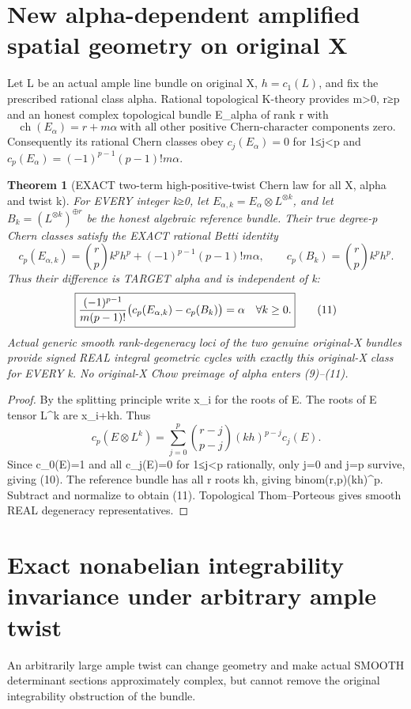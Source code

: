 \documentclass[11pt]{article}
\newtheorem{theorem}{Theorem}[section]
\begin{document}
\section{New alpha-dependent amplified spatial geometry on original X}
Let L be an actual ample
line bundle on original X,
$h=c_1(L)$, and fix the
prescribed rational class
alpha. Rational topological
K-theory provides m>0,
r≥p and an honest
complex topological bundle
E_alpha of rank r with
\[
 \boxed{
 \operatorname{ch}(E_\alpha)
     =r+m\alpha
 \ \text{with all other
 positive Chern-character
 components zero.}
 }                                                     \tag{9}
\]
Consequently its rational
Chern classes obey
$c_j(E_\alpha)=0$ for 1≤j<p
and
$c_p(E_\alpha)=
  (-1)^{p-1}(p-1)!m\alpha$.

\begin{theorem}[EXACT two-term high-positive-twist Chern law for all X, alpha and twist k]
For EVERY integer k≥0,
let $E_{\alpha,k}=
E_\alpha\otimes L^{\otimes k}$,
and let
$B_k=(L^{\otimes k})^{\oplus r}$
be the honest algebraic
reference bundle.
Their true degree-p
Chern classes satisfy the
EXACT rational Betti identity
\[
 \boxed{
 c_p(E_{\alpha,k})
  ={r\choose p}k^p h^p
      +(-1)^{p-1}(p-1)!m\alpha,
 \qquad
 c_p(B_k)={r\choose p}k^p h^p .
 }                                                     \tag{10}
\]
Thus their difference is
TARGET alpha and is
independent of k:
\[
 \boxed{
  {(-1)^{p-1}\over m(p-1)!}
      \big(c_p(E_{\alpha,k})-
               c_p(B_k)\big)=\alpha
       \quad \forall k\ge0.
 }                                                     \tag{11}
\]
Actual generic smooth
rank-degeneracy loci of
the two genuine original-X
bundles provide signed
REAL integral geometric
cycles with exactly this
original-X class for EVERY k.
No original-X Chow preimage
of alpha enters (9)--(11).
\end{theorem}
\begin{proof}
By the splitting principle
write x_i for the roots of E.
The roots of E tensor L^k
are x_i+kh. Thus
\[
 c_p(E\otimes L^k)
  =\sum_{j=0}^p
    {r-j\choose p-j}
     (kh)^{p-j}c_j(E).
                                                               \tag{12}
\]
Since c_0(E)=1 and
all c_j(E)=0 for
1≤j<p rationally,
only j=0 and j=p
survive, giving (10).
The reference bundle
has all r roots kh,
giving binom(r,p)(kh)^p.
Subtract and normalize
to obtain (11).
Topological Thom--Porteous
gives smooth REAL
degeneracy representatives.
\end{proof}

\section{Exact nonabelian integrability invariance under arbitrary ample twist}
An arbitrarily large ample twist can
change geometry and make actual
SMOOTH determinant sections
approximately complex,
but cannot remove
the original integrability
obstruction of the bundle.
\end{document}
